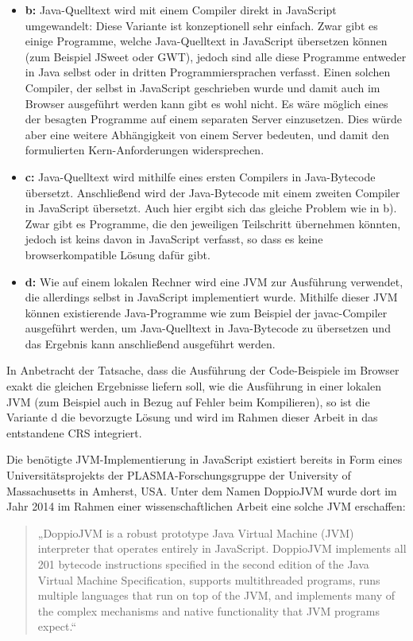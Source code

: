 \begin{itemize}
    \item \textbf{b:} Java-Quelltext wird mit einem Compiler direkt in JavaScript umgewandelt: Diese Variante ist konzeptionell sehr einfach. Zwar gibt es einige Programme, welche Java-Quelltext in JavaScript übersetzen können (zum Beispiel JSweet oder GWT), jedoch sind alle diese Programme entweder in Java selbst oder in dritten Programmiersprachen verfasst. Einen solchen Compiler, der selbst in JavaScript geschrieben wurde und damit auch im Browser ausgeführt werden kann gibt es wohl nicht. Es wäre möglich eines der besagten Programme auf einem separaten Server einzusetzen. Dies würde aber eine weitere Abhängigkeit von einem Server bedeuten, und damit den formulierten Kern-Anforderungen widersprechen.
    \item \textbf{c:} Java-Quelltext wird mithilfe eines ersten Compilers in Java-Bytecode übersetzt. Anschließend wird der Java-Bytecode mit einem zweiten Compiler in JavaScript übersetzt. Auch hier ergibt sich das gleiche Problem wie in b). Zwar gibt es Programme, die den jeweiligen Teilschritt übernehmen könnten, jedoch ist keins davon in JavaScript verfasst, so dass es keine browserkompatible Lösung dafür gibt.
    \item \textbf{d:} Wie auf einem lokalen Rechner wird eine JVM zur Ausführung verwendet, die allerdings selbst in JavaScript implementiert wurde. Mithilfe dieser JVM können existierende Java-Programme wie zum Beispiel der javac-Compiler ausgeführt werden, um Java-Quelltext in Java-Bytecode zu übersetzen und das Ergebnis kann anschließend ausgeführt werden.
\end{itemize}

In Anbetracht der Tatsache, dass die Ausführung der Code-Beispiele im Browser exakt die gleichen Ergebnisse liefern soll, wie die Ausführung in einer lokalen JVM (zum Beispiel auch in Bezug auf Fehler beim Kompilieren), so ist die Variante d die bevorzugte Lösung und wird im Rahmen dieser Arbeit in das entstandene CRS integriert.

Die benötigte JVM-Implementierung in JavaScript existiert bereits in Form eines Universitätsprojekts der PLASMA-Forschungsgruppe der University of Massachusetts in Amherst, USA. Unter dem Namen DoppioJVM wurde dort im Jahr 2014 im Rahmen einer wissenschaftlichen Arbeit eine solche JVM erschaffen:

\begin{quotation}
„DoppioJVM is a robust prototype Java Virtual Machine (JVM) interpreter
that operates entirely in JavaScript. DoppioJVM implements all 201 bytecode instructions specified in the second edition of the Java Virtual Machine Specification, supports multithreaded programs, runs multiple languages that run on top of the JVM, and implements many of the complex mechanisms and native functionality that JVM programs expect.“
\end{quotation}

